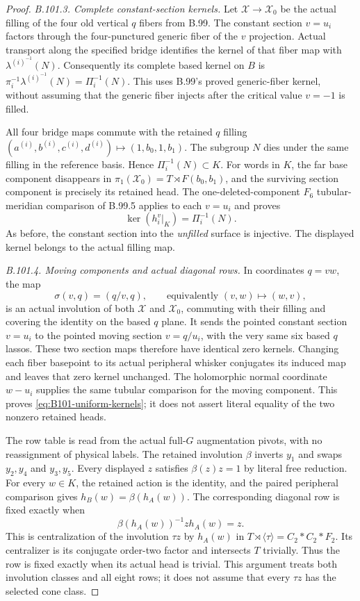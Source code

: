 \begin{proof}
\emph{B.101.3. Complete constant-section kernels.}
Let $\mathscr X\to\mathscr X_0$ be the actual filling of the four
old vertical $q$ fibers from B.99.
The constant section $v=u_i$ factors through the four-punctured
generic fiber of the $v$ projection.  Actual transport along the
specified bridge identifies the kernel of that fiber map with
$\lambda^{(i)}^{-1}(N)$.
Consequently its complete based kernel on $B$ is
$\pi_i^{-1}\lambda^{(i)}^{-1}(N)=\Pi_i^{-1}(N)$.
This uses B.99's proved generic-fiber kernel, without assuming that
the generic fiber injects after the critical value $v=-1$ is filled.

All four bridge maps commute with the retained $q$ filling
$(a^{(i)},b^{(i)},c^{(i)},d^{(i)})\mapsto(1,b_0,1,b_1)$.
The subgroup $N$ dies under the same filling in the reference basis.
Hence $\Pi_i^{-1}(N)\subset K$.
For words in $K$, the far base component disappears in
$\pi_1(\mathscr X_0)=T\rtimes F(b_0,b_1)$, and the surviving
section component is precisely its retained head.
The one-deleted-component $F_6$ tubular-meridian comparison of
B.99.5 applies to each $v=u_i$ and proves
\[
 \ker(h_i^v|_K)=\Pi_i^{-1}(N).
\]
As before, the constant section into the \emph{unfilled} surface
is injective.  The displayed kernel belongs to the actual filling map.

\emph{B.101.4. Moving components and actual diagonal rows.}
In coordinates $q=vw$, the map
\begin{equation}\label{eq:B101-swap}
 \sigma(v,q)=(q/v,q),\qquad\text{equivalently }(v,w)\mapsto(w,v),
\end{equation}
is an actual involution of both $\mathscr X$ and $\mathscr X_0$,
commuting with their filling and covering the identity on the based
$q$ plane.  It sends the pointed constant section $v=u_i$ to the
pointed moving section $v=q/u_i$, with the very same six based $q$ lassos.
These two section maps therefore have identical zero kernels.
Changing each fiber basepoint to its actual peripheral whisker
conjugates its induced map and leaves that zero kernel unchanged.
The holomorphic normal coordinate $w-u_i$ supplies the same tubular
comparison for the moving component.
This proves \eqref{eq:B101-uniform-kernels}; it does not assert
literal equality of the two nonzero retained heads.

The row table is read from the actual full-$G$ augmentation pivots,
with no reassignment of physical labels.
The retained involution $\beta$ inverts $y_1$ and swaps
$y_2,y_4$ and $y_3,y_5$.
Every displayed $z$ satisfies $\beta(z)z=1$ by literal free reduction.
For every $w\in K$, the retained action is the identity, and the
paired peripheral comparison gives $h_B(w)=\beta(h_A(w))$.
The corresponding diagonal row is fixed exactly when
\[
 \beta(h_A(w))^{-1}z h_A(w)=z.
\]
This is centralization of the involution $\tau z$ by $h_A(w)$ in
$T\rtimes\langle\tau\rangle=C_2*C_2*F_2$.
Its centralizer is its conjugate order-two factor and intersects
$T$ trivially.  Thus the row is fixed exactly when its actual head
is trivial.  This argument treats both involution classes and all
eight rows; it does not assume that every $\tau z$ has the selected
cone class.


\end{proof}
